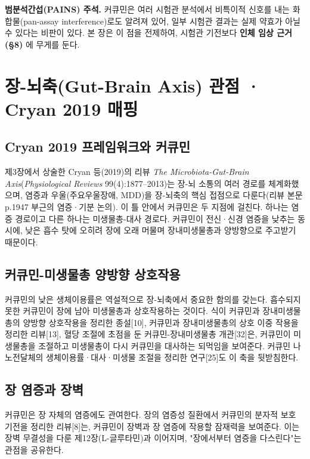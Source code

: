 \documentclass[12pt,oneside]{book}
\newenvironment{authnote}
  {\par\smallskip\begingroup\leftskip=6mm\rightskip=3mm\small\color{muted}\noindent\ignorespaces}
  {\par\endgroup\smallskip}
\begin{document}
\begin{authnote}\textbf{범분석간섭(PAINS) 주석.} 커큐민은 여러 시험관 분석에서 비특이적 신호를 내는 화합물(pan-assay interference)로도 알려져 있어, 일부 시험관 결과는 실제 약효가 아닐 수 있다는 비판이 있다. 본 장은 이 점을 전제하여, 시험관 기전보다 \textbf{인체 임상 근거(§8)} 에 무게를 둔다.\end{authnote}

\section{장-뇌축(Gut-Brain Axis) 관점 · Cryan 2019 매핑}

\subsection{Cryan 2019 프레임워크와 커큐민}

제3장에서 상술한 Cryan 등(2019)의 리뷰 \textit{The Microbiota-Gut-Brain Axis}(\textit{Physiological Reviews} 99(4):1877–2013)는 장-뇌 소통의 여러 경로를 체계화했으며, 염증과 우울(주요우울장애, MDD)을 장-뇌축의 핵심 접점으로 다룬다(리뷰 본문 p.1947 부근의 염증·기분 논의). 이 틀 안에서 커큐민은 두 지점에 걸친다. 하나는 염증 경로이고 다른 하나는 미생물총-대사 경로다. 커큐민이 전신·신경 염증을 낮추는 동시에, 낮은 흡수 탓에 오히려 장에 오래 머물며 장내미생물총과 양방향으로 주고받기 때문이다.

\subsection{커큐민-미생물총 양방향 상호작용}

커큐민의 낮은 생체이용률은 역설적으로 장-뇌축에서 중요한 함의를 갖는다. 흡수되지 못한 커큐민이 장에 남아 미생물총과 상호작용하는 것이다. 식이 커큐민과 장내미생물총의 양방향 상호작용을 정리한 종설[10], 커큐민과 장내미생물총의 상호 이중 작용을 정리한 리뷰[13], 혈당 조절에 초점을 둔 커큐민-장내미생물총 개관[32]은, 커큐민이 미생물총을 조절하고 미생물총이 다시 커큐민을 대사하는 되먹임을 보여준다. 커큐민 나노전달체의 생체이용률·대사·미생물 조절을 정리한 연구[25]도 이 축을 뒷받침한다.

\subsection{장 염증과 장벽}

커큐민은 장 자체의 염증에도 관여한다. 장의 염증성 질환에서 커큐민의 분자적 보호 기전을 정리한 리뷰[8]는, 커큐민이 장벽과 장 염증에 작용할 잠재력을 보여준다. 이는 장벽 무결성을 다룬 제12장(L-글루타민)과 이어지며, "장에서부터 염증을 다스린다"는 관점을 공유한다.
\end{document}
